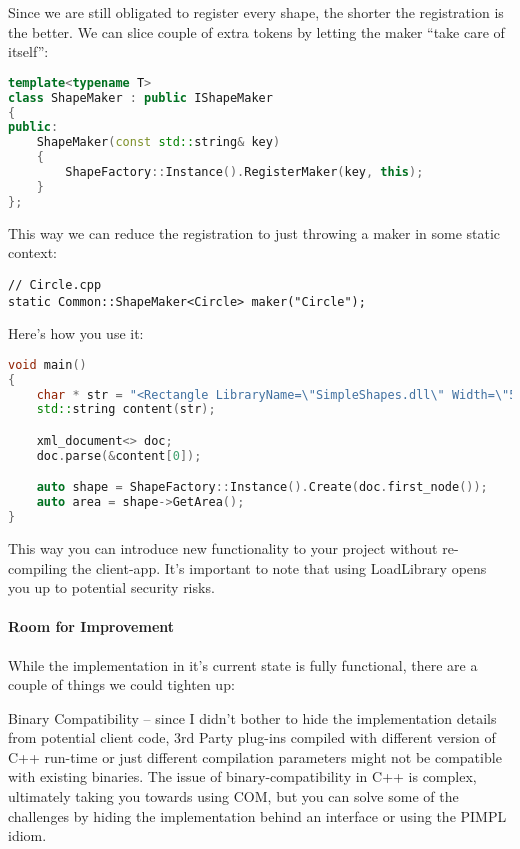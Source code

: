 \documentclass{book}
\begin{document}
Since we are still obligated to register every shape, the shorter the registration is the better.
We can slice couple of extra tokens by letting the maker “take care of itself”:

\begin{lstlisting}[caption={Abstract Factory Pattern sample 2-6}, language=C++]
template<typename T>
class ShapeMaker : public IShapeMaker
{
public:
    ShapeMaker(const std::string& key)
    {
        ShapeFactory::Instance().RegisterMaker(key, this);
    }
}; 
\end{lstlisting}

This way we can reduce the registration to just throwing a maker in some static context:

\begin{verbatim}
// Circle.cpp
static Common::ShapeMaker<Circle> maker("Circle");
\end{verbatim}

Here’s how you use it:

\begin{lstlisting}[caption={Abstract Factory Pattern sample 2-1}, language=C++]
void main()
{
    char * str = "<Rectangle LibraryName=\"SimpleShapes.dll\" Width=\"5.3\" Height=\"3.7\" />";
    std::string content(str);

    xml_document<> doc;
    doc.parse(&content[0]);

    auto shape = ShapeFactory::Instance().Create(doc.first_node());
    auto area = shape->GetArea();
}
\end{lstlisting}
This way you can introduce new functionality to your project without re-compiling the client-app.
It’s important to note that using LoadLibrary opens you up to potential security risks.

\paragraph{Room for Improvement}

While the implementation in it’s current state is fully functional, there are a couple of things we could tighten up:

    Binary Compatibility – since I didn’t bother to hide the implementation details from potential client code,
    3rd Party plug-ins compiled with different version of C++ run-time or just different compilation parameters might not be compatible with existing binaries.
    The issue of binary-compatibility in C++ is complex, ultimately taking you towards using COM,
    but you can solve some of the challenges by hiding the implementation behind an interface or using the PIMPL idiom.
\end{document}
